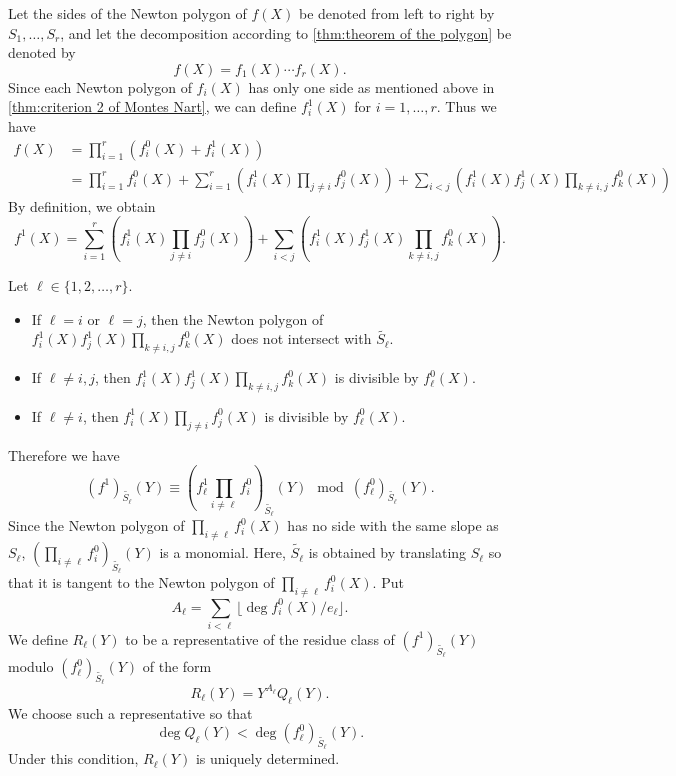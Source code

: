 \documentclass{article}
\theoremstyle{definition}
\theoremstyle{remark}
\numberwithin{equation}{section}
\begin{document}
  Let the sides of the Newton polygon of $f(X)$ be denoted from left to right by $S_{1},\dots,S_{r}$,
  and let the decomposition according to \cref{thm:theorem of the polygon} be denoted by
  \[
    f(X)=f_{1}(X)\cdots f_{r}(X).
  \]
  Since each Newton polygon of $f_{i}(X)$ has only one side as mentioned above in \cref{thm:criterion 2 of Montes Nart},
  we can define $f_{i}^{1}(X)$ for $i=1,\dots,r$.
  Thus we have
  \begin{align}
    f(X) &= \prod_{i=1}^{r}(f_{i}^{0}(X)+f_{i}^{1}(X)) \\
    &= \prod_{i=1}^{r}f_{i}^{0}(X) + \sum_{i=1}^{r}\left(f_{i}^{1}(X)\prod_{j\ne i}f_{j}^{0}(X)\right) + \sum_{i<j}\left(f_{i}^{1}(X)f_{j}^{1}(X)\prod_{k\ne i,j}f_{k}^{0}(X)\right)
  \end{align}
  By definition, we obtain
  \[
    f^{1}(X) = \sum_{i=1}^{r}\left(f_{i}^{1}(X)\prod_{j\ne i}f_{j}^{0}(X)\right) + \sum_{i<j}\left(f_{i}^{1}(X)f_{j}^{1}(X)\prod_{k\ne i,j}f_{k}^{0}(X)\right).
  \]

  Let $\ell\in\{1,2,\dots,r\}$.
  \begin{itemize}
    \item   If $\ell = i$ or $\ell = j$, then  the Newton polygon of $f_{i}^{1}(X)f_{j}^{1}(X)\prod_{k\ne i,j}f_{k}^{0}(X)$ does not intersect with $\widetilde{S_{\ell}}$.
    \item   If $\ell \ne i,j$, then $f_{i}^{1}(X)f_{j}^{1}(X)\prod_{k\ne i,j}f_{k}^{0}(X)$ is divisible by $f_{\ell}^{0}(X)$.
    \item   If $\ell \ne i$, then $f_{i}^{1}(X)\prod_{j\ne i}f_{j}^{0}(X)$ is divisible by $f_{\ell}^{0}(X)$.
  \end{itemize}
  Therefore we have
  \[
    (f^{1})_{\widetilde{S_{\ell}}}(Y) \equiv \left(f_{\ell}^{1}\prod_{i\ne\ell}f_{i}^0\right)_{\widetilde{S_{\ell}}}(Y) \mod (f_{\ell}^{0})_{\widetilde{S_{\ell}}}(Y).
  \]
  Since the Newton polygon of $\prod_{i\ne\ell}f_{i}^{0}(X)$ has no side with the same slope as $S_{\ell}$,
  $\left(\prod_{i\ne\ell}f_{i}^{0}\right)_{\widetilde{S_{\ell}}}(Y)$ is a monomial.
  Here, $\widetilde{S_{\ell}}$ is obtained by translating $S_{\ell}$ so that it is tangent to the Newton polygon of $\prod_{i\ne\ell}f_{i}^{0}(X)$.
  Put 
  \[
    A_{\ell} = \sum_{i<\ell}\lfloor \deg f_{i}^{0}(X)/e_{\ell}\rfloor. 
  \]
  We define $R_{\ell}(Y)$ to be a representative of the residue class of $(f^{1})_{\widetilde{S_{\ell}}}(Y)$ modulo $(f_{\ell}^{0})_{\widetilde{S_{\ell}}}(Y)$ of the form 
  \[
    R_{\ell}(Y) = Y^{A_{\ell}}Q_{\ell}(Y). 
  \]
  We choose such a representative so that 
  \[
    \deg Q_{\ell}(Y) < \deg (f_{\ell}^0)_{\widetilde{S_{\ell}}}(Y). 
  \]
  Under this condition, $R_{\ell}(Y)$ is uniquely determined. 
  
\end{document}
